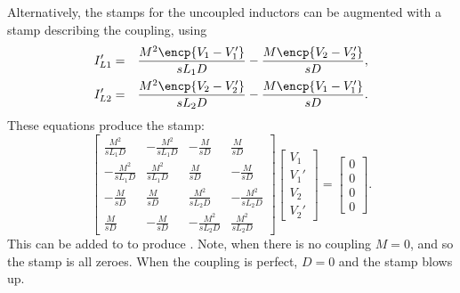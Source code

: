 \documentclass[a4paper, 12pt]{article}
\begin{document}
Alternatively, the stamps for the uncoupled inductors can be augmented
with a stamp describing the coupling, using
%
\begin{eqnarray}
  I'_{L1} & = & \frac{M^2\encp{V_1 - V_1'}}{sL_1 D} - \frac{M\encp{V_2 - V_2'}}{sD}, \\
  I'_{L2} & = & \frac{M^2\encp{V_2 - V_2'}}{sL_2 D} - \frac{M\encp{V_1 - V_1'}}{sD}.  
\end{eqnarray}
%
These equations produce the stamp:
%
\begin{equation}
  \begin{bmatrix}
    \frac{M^2}{sL_1 D} & -\frac{M^2}{sL_1 D} & -\frac{M}{sD}  & \frac{M}{sD} \\
   -\frac{M^2}{sL_1 D} & \frac{M^2}{sL_1 D}  & \frac{M}{sD}  & -\frac{M}{sD} \\
  -\frac{M}{sD} & \frac{M}{sD} &  \frac{M^2}{sL_2 D} & -\frac{M^2}{sL_2 D}   \\
   \frac{M}{sD} & -\frac{M}{sD} & -\frac{M^2}{sL_2 D} & \frac{M^2}{sL_2 D}  
  \end{bmatrix}
  \begin{bmatrix}
    V_1 \\ V_1' \\ V_2 \\ V_2'
  \end{bmatrix}
=
\begin{bmatrix}
0 \\ 0 \\ 0 \\ 0
\end{bmatrix}.
\end{equation}
%
This can be added to  to produce
.  Note, when there is no coupling $M=0$, and so
the stamp is all zeroes.  When the coupling is perfect, $D=0$ and the
stamp blows up.
\end{document}
